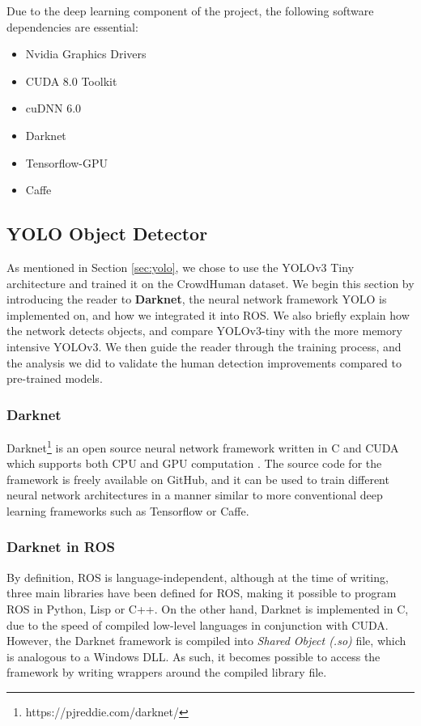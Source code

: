 Due to the deep learning component of the project, the following software dependencies are essential:
\begin{itemize}
	\item Nvidia Graphics Drivers 
	\item CUDA 8.0 Toolkit
	\item cuDNN 6.0
	\item Darknet
	\item Tensorflow-GPU
	\item Caffe
\end{itemize}

\subsection{YOLO Object Detector}
As mentioned in Section \ref{sec:yolo}, we chose to use the YOLOv3 Tiny architecture and trained it on the CrowdHuman dataset. We begin this section by introducing the reader to \textbf{Darknet}, the neural network framework YOLO is implemented on, and how we integrated it into ROS. We also briefly explain how the network detects objects, and compare YOLOv3-tiny with the more memory intensive YOLOv3. We then guide the reader through the training process, and the analysis we did to validate the human detection improvements compared to pre-trained models.

\subsubsection{Darknet}
Darknet\footnote{https://pjreddie.com/darknet/} is an open source neural network framework written in C and CUDA which supports both CPU and GPU computation \cite{darknet13}. The source code for the framework is freely available on GitHub, and it can be used to train different neural network architectures in a manner similar to more conventional deep learning frameworks such as Tensorflow or Caffe.

\subsubsection{Darknet in ROS}
By definition, ROS is language-independent, although at the time of writing, three main libraries have been defined for ROS, making it possible to program ROS in Python, Lisp or C++. On the other hand, Darknet is implemented in C, due to the speed of compiled low-level languages in conjunction with CUDA. However, the Darknet framework is compiled into \textit{Shared Object (.so)} file, which is analogous to a Windows DLL. As such, it becomes possible to access the framework by writing wrappers around the compiled library file.

